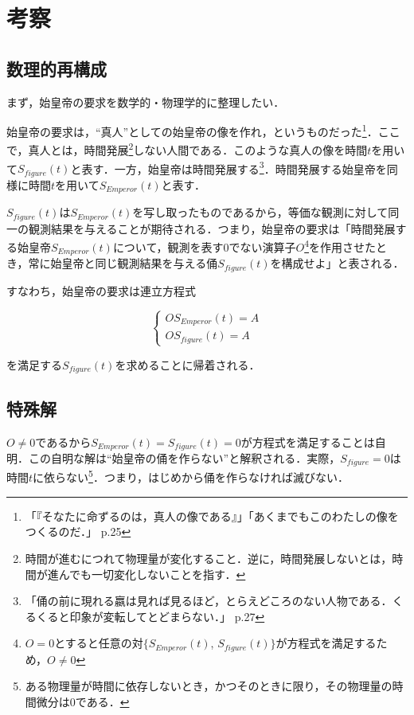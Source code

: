 \documentclass[10pt, a5paper, twoside]{jsarticle}
\theoremstyle{definition}
\begin{document}
	\section{考察}

		\subsection{数理的再構成}

			まず，始皇帝の要求を数学的・物理学的に整理したい．

			始皇帝の要求は，“真人”としての始皇帝の像を作れ，というものだった\footnote{「『そなたに命ずるのは，真人の像である』」「あくまでもこのわたしの像をつくるのだ．」\cite{mojika} p.25}．ここで，真人とは，時間発展\footnote{時間が進むにつれて物理量が変化すること．逆に，時間発展しないとは，時間が進んでも一切変化しないことを指す．}しない人間である．このような真人の像を時間$t$を用いて$ S_{figure}(t) $と表す．一方，始皇帝は時間発展する\footnote{「俑の前に現れる嬴は見れば見るほど，とらえどころのない人物である．くるくると印象が変転してとどまらない．」\cite{mojika} p.27}．時間発展する始皇帝を同様に時間$t$を用いて$ S_{Emperor}(t) $と表す．

			$S_{figure}(t)$は$S_{Emperor}(t)$を写し取ったものであるから，等価な観測に対して同一の観測結果を与えることが期待される．つまり，始皇帝の要求は「時間発展する始皇帝$ S_{Emperor}(t) $について，観測を表す0でない演算子$ O $\footnote{$ O = 0 $とすると任意の対$ \{ S_{Emperor}(t)$, $ S_{figure}(t) \} $が方程式を満足するため，$ O \neq 0 $}を作用させたとき，常に始皇帝と同じ観測結果を与える俑$ S_{figure}(t) $を構成せよ」と表される．

			すなわち，始皇帝の要求は連立方程式

			\begin{equation*}
				\begin{cases}
					O S_{Emperor}(t) = A \\ O S_{figure}(t) = A
				\end{cases}
			\end{equation*}

			を満足する$ S_{figure}(t) $を求めることに帰着される．

		\subsection{特殊解}\label{spe}

			$ O \neq 0 $であるから$ S_{Emperor}(t) = S_{figure}(t) = 0 $が方程式を満足することは自明．この自明な解は“始皇帝の俑を作らない”と解釈される．実際，$ S_{figure} = 0 $は時間$t$に依らない\footnote{ある物理量が時間に依存しないとき，かつそのときに限り，その物理量の時間微分は0である．}．つまり，はじめから俑を作らなければ滅びない．
\end{document}
